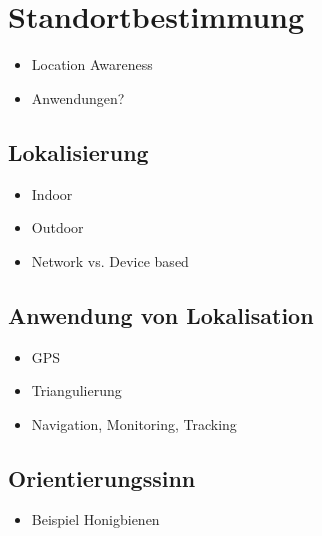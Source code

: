\chapter{Standortbestimmung}
\begin{itemize}
    \item Location Awareness
    \item Anwendungen?
\end{itemize}

\section{Lokalisierung}
\begin{itemize}
    \item Indoor
    \item Outdoor
    \item Network vs. Device based
\end{itemize}

\section{Anwendung von Lokalisation}
\begin{itemize}
    \item GPS
    \item Triangulierung
    \item Navigation, Monitoring, Tracking
\end{itemize}



\section{Orientierungssinn}
\begin{itemize}
    \item Beispiel Honigbienen
\end{itemize}
